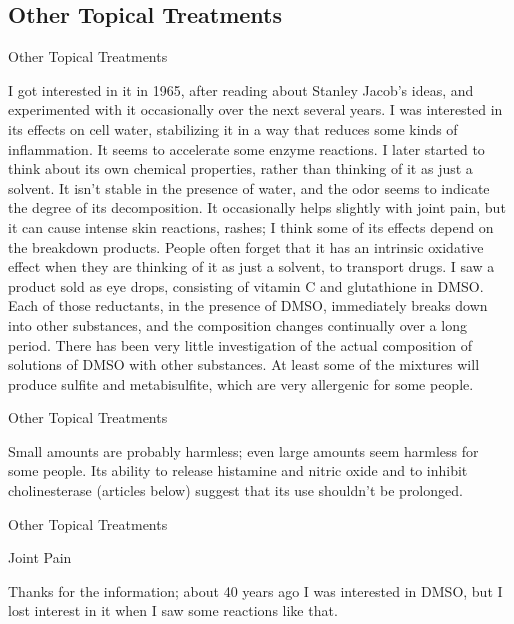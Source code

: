 \documentclass[11pt,oneside,openany,extrafontsizes]{memoir}
\begin{document}
\subsection{Other Topical Treatments}

\begin{standalonequote}{Other Topical Treatments}

    \begin{answer}
        I got interested in it in 1965, after reading about Stanley Jacob's ideas, and experimented with it occasionally over the next several years. I was interested in its effects on cell water, stabilizing it in a way that reduces some kinds of inflammation. It seems to accelerate some enzyme reactions. I later started to think about its own chemical properties, rather than thinking of it as just a solvent. It isn't stable in the presence of water, and the odor seems to indicate the degree of its decomposition. It occasionally helps slightly with joint pain, but it can cause intense skin reactions, rashes; I think some of its effects depend on the breakdown products. People often forget that it has an intrinsic oxidative effect when they are thinking of it as just a solvent, to transport drugs. I saw a product sold as eye drops, consisting of vitamin C and glutathione in DMSO. Each of those reductants, in the presence of DMSO, immediately breaks down into other substances, and the composition changes continually over a long period. There has been very little investigation of the actual composition of solutions of DMSO with other substances. At least some of the mixtures will produce sulfite and metabisulfite, which are very allergenic for some people.
    \end{answer}
\end{standalonequote}

\begin{standalonequote}{Other Topical Treatments}

    \begin{answer}
        Small amounts are probably harmless; even large amounts seem harmless for some people. Its ability to release histamine and nitric oxide and to inhibit cholinesterase (articles below) suggest that its use shouldn't be prolonged. 
    \end{answer}
\end{standalonequote}

\begin{standalonequote}{Other Topical Treatments}
    \begin{note}
        Joint Pain
    \end{note}

    \begin{answer}
        Thanks for the information; about 40 years ago I was interested in DMSO, but I lost interest in it when I saw some reactions like that.
    \end{answer}
\end{standalonequote}
\end{document}

